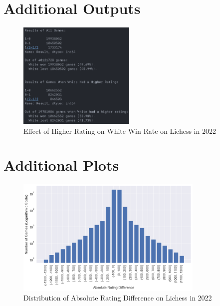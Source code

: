 \documentclass[a4paper, 11pt]{article}
\begin{document}



\newpage
\begin{appendices}

\section{Additional Outputs}
\begin{figure}[H]
    \centering
    \caption{Effect of Higher Rating on White Win Rate on Lichess in 2022}
    \label{fig:effectOfHigherRatingOnWhiteWinRate}
    \includegraphics[width=0.5\textwidth]{Effect of Higher Rating on White Win Rate.png}
\end{figure}

\section{Additional Plots}
\begin{figure}[H]
    \centering
    \caption{Distribution of Absolute Rating Difference on Lichess in 2022}
    \label{fig:distributionOfAbsoluteRatingDifference}
    \includegraphics[width=0.8\textwidth]{Distribution of Absolute Rating Difference.png}
\end{figure}


\end{appendices}
\end{document}
